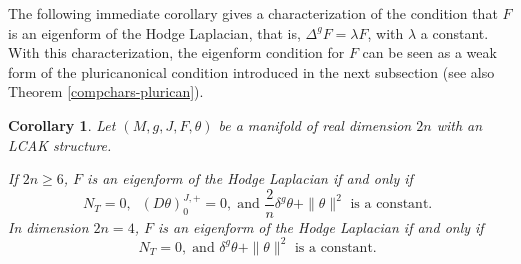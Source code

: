 \documentclass[a4paper,11pt]{amsart}
\newtheorem{cor}[thm]{Corollary}
\theoremstyle{definition}
\renewcommand{\[}{\begin{equation*}}
\renewcommand{\]}{\end{equation*}}
\begin{document}
\noindent The following immediate corollary gives a characterization of the condition that $F$ is an eigenform of the Hodge Laplacian, that is, $\Delta^g F = \lambda F$, with $\lambda$ a constant. With this characterization, the eigenform condition for $F$ can be seen as a weak form of the pluricanonical condition introduced in the next subsection (see also Theorem \ref{compchars-plurican}).

\begin{cor} \label{F-eigenv-char}
Let $(M, g, J, F, \theta)$ be a manifold of real dimension $2n$ with an LCAK structure. 

\noindent If $2n \geq 6$, $F$ is an eigenform of the Hodge Laplacian  if and only if 
$$N_T =0, \; \; (D \theta)^{J,+}_0 = 0, \;  \mbox{and } 
\frac{2}{n} \delta^g \theta + \| \theta \|^2 \mbox{ is a constant. } $$
In dimension $2n = 4$, $F$ is an eigenform of the Hodge Laplacian if and only if 
$$N_T =0   , \;  \mbox{and }  \delta^g \theta + \| \theta \|^2 \mbox{ is a constant. } $$  
\end{cor}

%    
\end{document}

